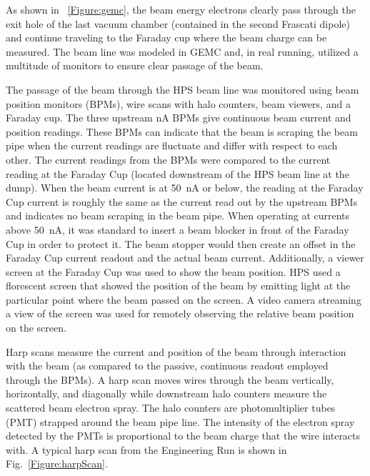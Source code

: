 As shown in ~\ref{Figure:gemc}, the beam energy electrons clearly pass through the exit hole of the last vacuum chamber (contained in the second Frascati dipole) and continue traveling to the Faraday cup where the beam charge can be measured. The beam line was modeled in GEMC and, in real running, utilized a multitude of monitors to ensure clear passage of the beam.

The passage of the beam through the HPS beam line was monitored using beam position monitors (BPMs), wire scans with halo counters, beam viewers, and a Faraday cup. The three upstream nA BPMs give continuous beam current and position readings. These BPMs can indicate that the beam is scraping the beam pipe when the current readings are fluctuate and differ with respect to each other. The current readings from the BPMs were compared to the current reading at the Faraday Cup (located downstream of the HPS beam line at the dump). When the beam current is at 50~nA or below, the reading at the Faraday Cup current is roughly the same as the current read out by the upstream BPMs and indicates no beam scraping in the beam pipe. When operating at currents above 50~nA, it was standard to insert a beam blocker in front of the Faraday Cup in order to protect it. The beam stopper would then create an offset in the Faraday Cup current readout and the actual beam current. Additionally, a viewer screen at the Faraday Cup was used to show the beam position. HPS used a florescent screen that showed the position of the beam by emitting light at the particular point where the beam passed on the screen. A video camera streaming a view of the screen was used for remotely observing the relative beam position on the screen.  

Harp scans measure the current and position of the beam through interaction with the beam (as compared to the passive, continuous readout employed through the BPMs). A harp scan moves wires through the beam vertically, horizontally, and diagonally while  downstream halo counters measure the scattered beam electron spray. The halo counters are photomultiplier tubes (PMT) strapped around the beam pipe line. The intensity of the electron spray detected by the PMTs is proportional to the beam charge that the wire interacts with. A typical harp scan from the Engineering Run is shown in Fig.~\ref{Figure:harpScan}.

